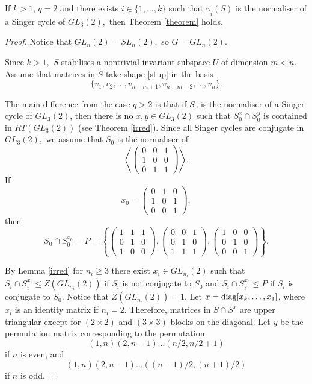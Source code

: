 \begin{Th}
\label{lem42}
If $k>1$,  $q=2$ and  there exists  $i \in \{1, \ldots, k\}$ such that $\gamma_i(S)$ is the normaliser of a Singer cycle of $GL_3(2),$ then Theorem {\rm \ref{theorem}} holds.
\end{Th} 
\begin{proof}
Notice that $GL_n(2)=SL_n(2),$ so $G=GL_n(2).$  %


Since $k>1,$ $S$ stabilises a nontrivial invariant subspace $U$ of dimension $m<n$. Assume that matrices in $S$ take shape \eqref{stup} in the  basis $$\{v_1, v_2, \ldots, v_{n-m+1}, v_{n-m+2}, \ldots, v_n \}.$$

The main difference from the case $q>2$ is  that if $S_0$ is the normaliser of a Singer cycle of $GL_3(2)$, then there is no $x, y \in GL_3(2)$ such that $S_0^{x} \cap S_0^{y}$ is contained in $RT(GL_3(2))$ (see Theorem \ref{irred}). Since all Singer cycles are conjugate in $GL_3(2),$ we assume that $S_0$ is the normaliser of $$
\left\langle
\begin{pmatrix}
0&0&1\\
1&0&0\\
0&1&1
\end{pmatrix}
 \right\rangle.
$$ If $$x_0=\begin{pmatrix}
0&1&0\\
1&0&1\\
0&0&1
\end{pmatrix},
$$ then 
\begin{equation*}
S_0 \cap S_0^{x_0} = P =  \left\{
\begin{pmatrix}
1 & 1& 1\\
0& 1 & 0\\
1 & 0 & 0
\end{pmatrix},
\begin{pmatrix}
0 & 0& 1\\
0& 1 & 0\\
1 & 1 & 1
\end{pmatrix},
\begin{pmatrix}
1 & 0& 0\\
0& 1 & 0\\
0 & 0 & 1
\end{pmatrix} \right\}. 
\end{equation*} 


By Lemma \ref{irred} for $n_i \ge 3$   there exist $x_i\in GL_{n_i}(2)$ such that $S_i \cap S_i^{x_i} \le Z(GL_{n_i}(2))$ if $S_i$ is not conjugate to $S_0$ and $S_i \cap S_i^{x_0} \le P$ if $S_i$ is conjugate to $S_0$. Notice that $Z(GL_{n_i}(2))=1.$  Let $x=\mathrm{diag}[x_k, \ldots, x_1]$, where $x_i$ is an identity matrix if $n_i = 2.$  Therefore, matrices in $S \cap S^x$ are upper triangular except for $(2 \times 2)$ and  $(3 \times 3)$ blocks on the diagonal. Let $y$ be the permutation matrix corresponding to the permutation $$(1,n)(2, n-1) \ldots (n/2, n/2+1)$$ if $n$ is even, and $$(1,n)(2, n-1) \ldots ((n-1)/2, (n+1)/2)$$ if $n$ is odd.


\end{proof}
